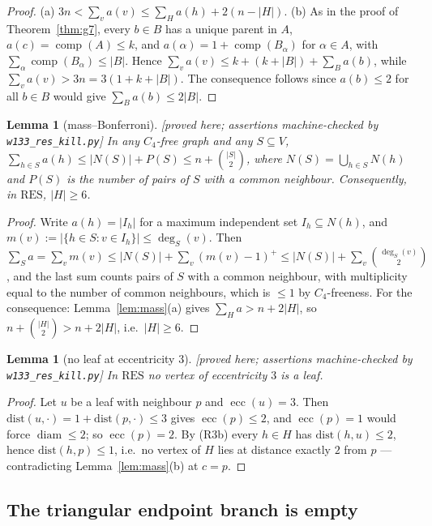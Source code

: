 \documentclass[11pt]{article}
\theoremstyle{plain}
\newtheorem{lemma}[theorem]{Lemma}
\theoremstyle{definition}
\theoremstyle{remark}
\numberwithin{equation}{section}
\newcommand{\ecc}{\operatorname{ecc}}
\newcommand{\diam}{\operatorname{diam}}
\newcommand{\comp}{\operatorname{comp}}
\newcommand{\statusbox}[1]{{\small\sloppy\textsf{[#1]}}}
\newcommand{\PRV}[1]{\statusbox{proved here; assertions machine-checked by \texttt{#1}}}
\begin{document}
\begin{proof}
(a) $3n < \sum_v a(v) \le \sum_H a(h) + 2(n - |H|)$.
(b) As in the proof of Theorem~\ref{thm:g7}, every $b \in B$ has a unique parent in $A$,
$a(c) = \comp(A) \le k$, and $a(\alpha) = 1 + \comp(B_\alpha)$ for $\alpha \in A$, with
$\sum_\alpha \comp(B_\alpha) \le |B|$. Hence
$\sum_v a(v) \le k + (k + |B|) + \sum_B a(b)$, while $\sum_v a(v) > 3n = 3(1+k+|B|)$. The
consequence follows since $a(b) \le 2$ for all $b \in B$ would give
$\sum_B a(b) \le 2|B|$.
\end{proof}

\begin{lemma}[mass--Bonferroni]\label{lem:g18}
\PRV{w133\_res\_kill.py}
In any $C_4$-free graph and any $S \subseteq V$,
$\sum_{h \in S} a(h) \le |N(S)| + P(S) \le n + \binom{|S|}{2}$, where
$N(S) = \bigcup_{h\in S}N(h)$ and $P(S)$ is the number of pairs of $S$ with a common
neighbour. Consequently, in $\mathrm{RES}$, $|H| \ge 6$.
\end{lemma}

\begin{proof}
Write $a(h) = |I_h|$ for a maximum independent set $I_h \subseteq N(h)$, and
$m(v) := |\{h \in S : v \in I_h\}| \le \deg_S(v)$. Then
$\sum_S a = \sum_v m(v) \le |N(S)| + \sum_v (m(v)-1)^+ \le |N(S)| + \sum_v
\binom{\deg_S(v)}{2}$, and the last sum counts pairs of $S$ with a common neighbour, with
multiplicity equal to the number of common neighbours, which is $\le 1$ by $C_4$-freeness.
For the consequence: Lemma~\ref{lem:mass}(a) gives $\sum_H a > n + 2|H|$, so
$n + \binom{|H|}{2} > n + 2|H|$, i.e.\ $|H| \ge 6$.
\end{proof}

\begin{lemma}[no leaf at eccentricity 3]\label{lem:g19}
\PRV{w133\_res\_kill.py}
In $\mathrm{RES}$ no vertex of eccentricity $3$ is a leaf.
\end{lemma}

\begin{proof}
Let $u$ be a leaf with neighbour $p$ and $\ecc(u) = 3$. Then
$\mathrm{dist}(u,\cdot) = 1 + \mathrm{dist}(p,\cdot) \le 3$ gives $\ecc(p) \le 2$, and
$\ecc(p) = 1$ would force $\diam \le 2$; so $\ecc(p) = 2$. By (R3b) every $h \in H$ has
$\mathrm{dist}(h,u) \le 2$, hence $\mathrm{dist}(h,p) \le 1$, i.e.\ no vertex of $H$ lies at
distance exactly $2$ from $p$ --- contradicting Lemma~\ref{lem:mass}(b) at $c = p$.
\end{proof}

\subsection{The triangular endpoint branch is empty}\label{sec:tri}
\end{document}
